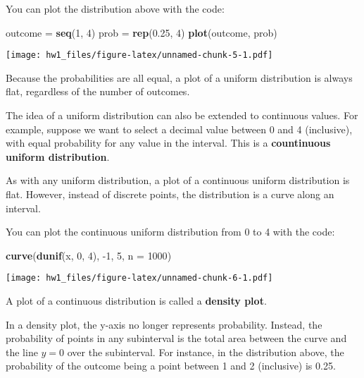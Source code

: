 \documentclass[
]{article}
\newenvironment{Shaded}{\begin{snugshade}}{\end{snugshade}}
\newcommand{\DataTypeTok}[1]{\textcolor[rgb]{0.13,0.29,0.53}{#1}}
\newcommand{\DecValTok}[1]{\textcolor[rgb]{0.00,0.00,0.81}{#1}}
\newcommand{\FloatTok}[1]{\textcolor[rgb]{0.00,0.00,0.81}{#1}}
\newcommand{\KeywordTok}[1]{\textcolor[rgb]{0.13,0.29,0.53}{\textbf{#1}}}
\newcommand{\NormalTok}[1]{#1}
\newcommand{\StringTok}[1]{\textcolor[rgb]{0.31,0.60,0.02}{#1}}
\begin{document}
You can plot the distribution above with the code:

\begin{Shaded}
\begin{Highlighting}[]
\NormalTok{outcome =}\StringTok{ }\KeywordTok{seq}\NormalTok{(}\DecValTok{1}\NormalTok{, }\DecValTok{4}\NormalTok{)}
\NormalTok{prob =}\StringTok{ }\KeywordTok{rep}\NormalTok{(}\FloatTok{0.25}\NormalTok{, }\DecValTok{4}\NormalTok{)}
\KeywordTok{plot}\NormalTok{(outcome, prob)}
\end{Highlighting}
\end{Shaded}

\texttt{[image: hw1\_files/figure-latex/unnamed-chunk-5-1.pdf]}

Because the probabilities are all equal, a plot of a uniform
distribution is always flat, regardless of the number of outcomes.

The idea of a uniform distribution can also be extended to continuous
values. For example, suppose we want to select a decimal value between 0
and 4 (inclusive), with equal probability for any value in the interval.
This is a \textbf{countinuous uniform distribution}.

As with any uniform distribution, a plot of a continuous uniform
distribution is flat. However, instead of discrete points, the
distribution is a curve along an interval.

You can plot the continuous uniform distribution from 0 to 4 with the
code:

\begin{Shaded}
\begin{Highlighting}[]
\KeywordTok{curve}\NormalTok{(}\KeywordTok{dunif}\NormalTok{(x, }\DecValTok{0}\NormalTok{, }\DecValTok{4}\NormalTok{), }\DecValTok{{-}1}\NormalTok{, }\DecValTok{5}\NormalTok{, }\DataTypeTok{n =} \DecValTok{1000}\NormalTok{)}
\end{Highlighting}
\end{Shaded}

\texttt{[image: hw1\_files/figure-latex/unnamed-chunk-6-1.pdf]}

A plot of a continuous distribution is called a \textbf{density plot}.

In a density plot, the y-axis no longer represents probability. Instead,
the probability of points in any subinterval is the total area between
the curve and the line \(y = 0\) over the subinterval. For instance, in
the distribution above, the probability of the outcome being a point
between 1 and 2 (inclusive) is 0.25.
\end{document}
